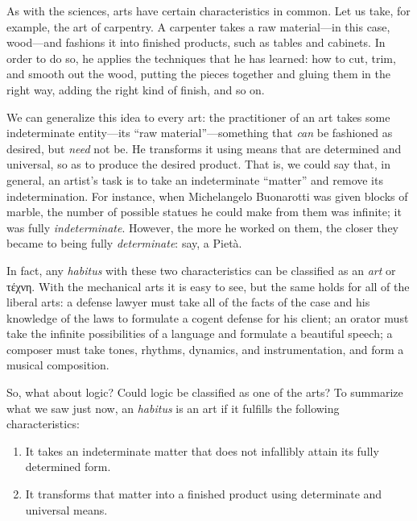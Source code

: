 \documentclass[article,12pt,a4paper,oneside]{memoir}
\begin{document}
    As with the sciences, arts have certain characteristics in common.
    Let us take, for example, the art of carpentry. A carpenter takes a
    raw material---in this case, wood---and fashions it into finished
    products, such as tables and cabinets. In order to do so, he applies
    the techniques that he has learned: how to cut, trim, and smooth out
    the wood, putting the pieces together and gluing them in the right
    way, adding the right kind of finish, and so on.

    We can generalize this idea to every art: the practitioner of an art
    takes some indeterminate entity---its ``raw material''---something
    that \emph{can} be fashioned as desired, but \emph{need} not be. He
    transforms it using means that are determined and universal, so as
    to produce the desired product. That is, we could say that, in
    general, an artist's task is to take an indeterminate ``matter'' and
    remove its indetermination. For instance, when Michelangelo
    Buonarotti was given blocks of marble, the number of possible
    statues he could make from them was infinite; it was fully
    \emph{indeterminate}. However, the more he worked on them, the
    closer they became to being fully \emph{determinate}: say, a Pietà.

    In fact, any \emph{habitus} with these two characteristics can be
    classified as an \emph{art} or τέχνη. With the mechanical arts it is
    easy to see, but the same holds for all of the liberal arts: a
    defense lawyer must take all of the facts of the case and his
    knowledge of the laws to formulate a cogent defense for his client;
    an orator must take the infinite possibilities of a language and
    formulate a beautiful speech; a composer must take tones, rhythms,
    dynamics, and instrumentation, and form a musical composition.

    So, what about logic? Could logic be classified as one of the arts?
    To summarize what we saw just now, an \emph{habitus} is an art if it
    fulfills the following characteristics:

    \begin{enumerate}
    \def\labelenumi{\arabic{enumi}.}
    \item
      It takes an indeterminate matter that does not infallibly attain
      its fully determined form.
    \item
      It transforms that matter into a finished product using
      determinate and universal means.
    \end{enumerate}
\end{document}
